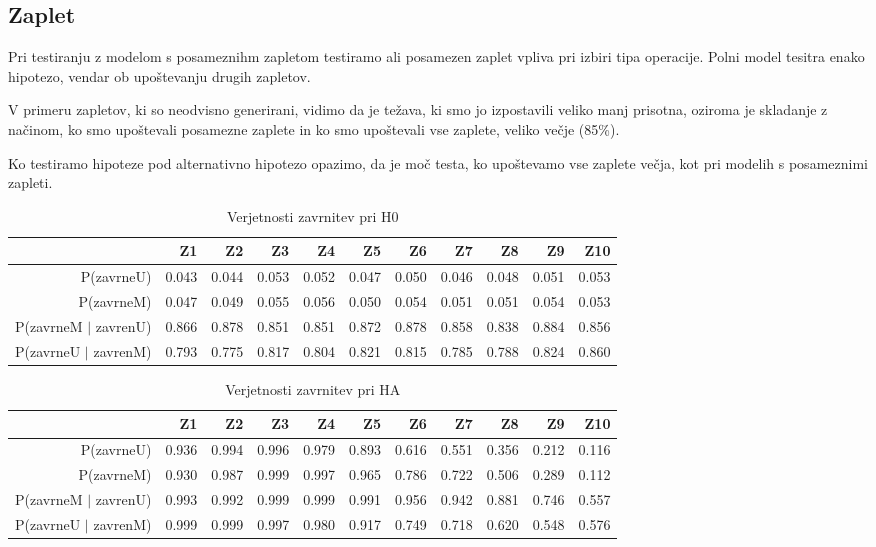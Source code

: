 \documentclass[letterpaper,11pt]{article}
\begin{document}

\newpage
\subsection{Zaplet}
Pri testiranju z modelom s posameznihm zapletom testiramo ali posamezen zaplet vpliva pri izbiri tipa operacije. Polni model tesitra enako hipotezo, vendar ob upoštevanju drugih zapletov.

V primeru zapletov, ki so neodvisno generirani, vidimo da je težava, ki smo jo izpostavili veliko manj prisotna, oziroma je skladanje z načinom, ko smo upoštevali posamezne zaplete in ko smo upoštevali vse zaplete, veliko večje (85\%).

Ko testiramo hipoteze pod alternativno hipotezo opazimo, da je moč testa, ko upoštevamo vse zaplete večja, kot pri modelih s posameznimi zapleti.

\begin{table}[ht]
\centering
\begin{tabular}{rrrrrrrrrrr}
  \hline
 & Z1 & Z2 & Z3 & Z4 & Z5 & Z6 & Z7 & Z8 & Z9 & Z10 \\ 
  \hline
P(zavrneU) & 0.043 & 0.044 & 0.053 & 0.052 & 0.047 & 0.050 & 0.046 & 0.048 & 0.051 & 0.053 \\ 
  P(zavrneM) & 0.047 & 0.049 & 0.055 & 0.056 & 0.050 & 0.054 & 0.051 & 0.051 & 0.054 & 0.053 \\ 
  P(zavrneM $|$ zavrenU) & 0.866 & 0.878 & 0.851 & 0.851 & 0.872 & 0.878 & 0.858 & 0.838 & 0.884 & 0.856 \\ 
  P(zavrneU $|$ zavrenM) & 0.793 & 0.775 & 0.817 & 0.804 & 0.821 & 0.815 & 0.785 & 0.788 & 0.824 & 0.860 \\ 
   \hline
\end{tabular}
\caption{Verjetnosti zavrnitev pri H0} 
\label{table:6}
\end{table}
\begin{table}[ht]
\centering
\begin{tabular}{rrrrrrrrrrr}
  \hline
 & Z1 & Z2 & Z3 & Z4 & Z5 & Z6 & Z7 & Z8 & Z9 & Z10 \\ 
  \hline
P(zavrneU) & 0.936 & 0.994 & 0.996 & 0.979 & 0.893 & 0.616 & 0.551 & 0.356 & 0.212 & 0.116 \\ 
  P(zavrneM) & 0.930 & 0.987 & 0.999 & 0.997 & 0.965 & 0.786 & 0.722 & 0.506 & 0.289 & 0.112 \\ 
  P(zavrneM $|$ zavrenU) & 0.993 & 0.992 & 0.999 & 0.999 & 0.991 & 0.956 & 0.942 & 0.881 & 0.746 & 0.557 \\ 
  P(zavrneU $|$ zavrenM) & 0.999 & 0.999 & 0.997 & 0.980 & 0.917 & 0.749 & 0.718 & 0.620 & 0.548 & 0.576 \\ 
   \hline
\end{tabular}
\caption{Verjetnosti zavrnitev pri HA} 
\label{table:7}
\end{table}
\end{document}

